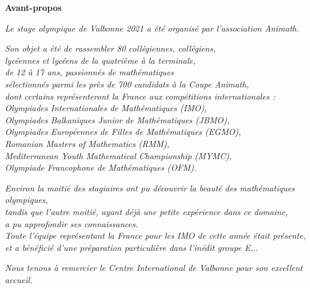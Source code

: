 \begin{flushright}

\textbf{\Large{Avant-propos}}

\bigskip

\emph{Le stage olympique de Valbonne 2021 a été organisé par l'association Animath.}

\bigskip

\emph{Son objet a été de rassembler 80 collégiennes, collégiens,\\
lycéennes et lycéens de la quatrième à la terminale, \\
de 12 à 17 ans, passionnés de mathématiques \\
sélectionnés parmi les près de 700 candidats à la Coupe Animath, \\
dont certains représenteront la France aux compétitions internationales : \\
Olympiades Internationales de Mathématiques (IMO), \\
Olympiades Balkaniques Junior de Mathématiques (JBMO), \\
Olympiades Européennes de Filles de Mathématiques (EGMO), \\
Romanian Masters of Mathematics (RMM), \\ 
Mediterranean Youth Mathematical Championship (MYMC), \\
Olympiade Francophone de Mathématiques (OFM).}

\bigskip

\emph{
Environ la moitié des stagiaires ont pu découvrir la beauté des mathématiques olympiques,\\
tandis que l'autre moitié, ayant déjà une petite expérience dans ce domaine,\\
a pu approfondir ses connaissances.\\
Toute l'équipe représentant la France pour les IMO de cette année était présente,\\
et a bénéficié d'une préparation particulière dans l'inédit groupe E...\\
}
 
\vspace{3cm}

\emph{Nous tenons à remercier le Centre International de Valbonne pour son excellent accueil.}
\end{flushright}




\pagebreak

\mbox { }

\pagebreak


